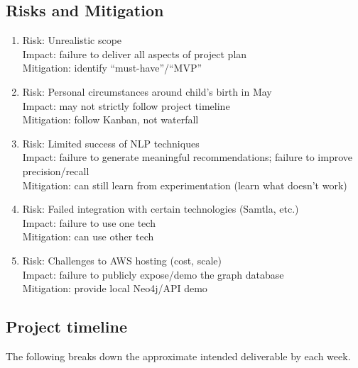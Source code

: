 \documentclass[11pt]{article}   	%
\begin{document}
\subsection{Risks and Mitigation}
\begin{enumerate}
\item Risk: Unrealistic scope \\
Impact: failure to deliver all aspects of project plan \\
Mitigation: identify “must-have”/“MVP”
\item Risk: Personal circumstances around child's birth in May \\
Impact: may not strictly follow project timeline \\
Mitigation: follow Kanban, not waterfall
\item Risk: Limited success of NLP techniques \\
Impact: failure to generate meaningful recommendations; failure to improve precision/recall \\
Mitigation: can still learn from experimentation (learn what doesn’t work)
\item Risk: Failed integration with certain technologies (Samtla, etc.) \\
Impact: failure to use one tech \\
Mitigation: can use other tech
\item Risk: Challenges to AWS hosting (cost, scale) \\
Impact: failure to publicly expose/demo the graph database \\
Mitigation: provide local Neo4j/API demo
\end{enumerate}


\subsection{Project timeline}
The following breaks down the approximate intended deliverable by each week.
\end{document}
